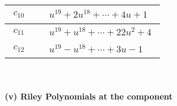 \documentclass[1p]{elsarticle_modified}
\theoremstyle{definition}
\begin{document}
\begin{tabular}{m{50pt}|m{274pt}}
\hline $$\begin{aligned}c_{10}\end{aligned}$$&$\begin{aligned}
&u^{19}+2 u^{18}+\cdots+4 u+1
\end{aligned}$\\
\hline $$\begin{aligned}c_{11}\end{aligned}$$&$\begin{aligned}
&u^{19}+u^{18}+\cdots+22 u^2+4
\end{aligned}$\\
\hline $$\begin{aligned}c_{12}\end{aligned}$$&$\begin{aligned}
&u^{19}- u^{18}+\cdots+3 u-1
\end{aligned}$\\
\hline
\end{tabular}\\~\\
\newpage\renewcommand{\arraystretch}{1}
\flushleft \textbf{(v) Riley Polynomials at the component}\newline \\
\end{document}
